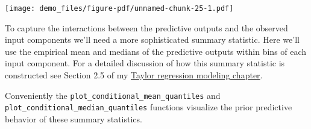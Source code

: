 \documentclass[
  letterpaper,
  DIV=11,
  numbers=noendperiod]{scrartcl}
\newenvironment{Shaded}{\begin{snugshade}}{\end{snugshade}}
\newcommand{\AttributeTok}[1]{\textcolor[rgb]{0.40,0.45,0.13}{#1}}
\newcommand{\ControlFlowTok}[1]{\textcolor[rgb]{0.00,0.23,0.31}{#1}}
\newcommand{\DecValTok}[1]{\textcolor[rgb]{0.68,0.00,0.00}{#1}}
\newcommand{\FunctionTok}[1]{\textcolor[rgb]{0.28,0.35,0.67}{#1}}
\newcommand{\NormalTok}[1]{\textcolor[rgb]{0.00,0.23,0.31}{#1}}
\newcommand{\OtherTok}[1]{\textcolor[rgb]{0.00,0.23,0.31}{#1}}
\newcommand{\SpecialCharTok}[1]{\textcolor[rgb]{0.37,0.37,0.37}{#1}}
\newcommand{\StringTok}[1]{\textcolor[rgb]{0.13,0.47,0.30}{#1}}
\begin{document}
\texttt{[image: demo\_files/figure-pdf/unnamed-chunk-25-1.pdf]}

To capture the interactions between the predictive outputs and the
observed input components we'll need a more sophisticated summary
statistic. Here we'll use the empirical mean and medians of the
predictive outputs within bins of each input component. For a detailed
discussion of how this summary statistic is constructed see Section 2.5
of my
\href{https://betanalpha.github.io/assets/case_studies/taylor_models.html\#25_Posterior_Retrodictive_Checks}{Taylor
regression modeling chapter}.

Conveniently the \texttt{plot\_conditional\_mean\_quantiles} and
\texttt{plot\_conditional\_median\_quantiles} functions visualize the
prior predictive behavior of these summary statistics.

\begin{Shaded}
\end{Shaded}
\end{document}
